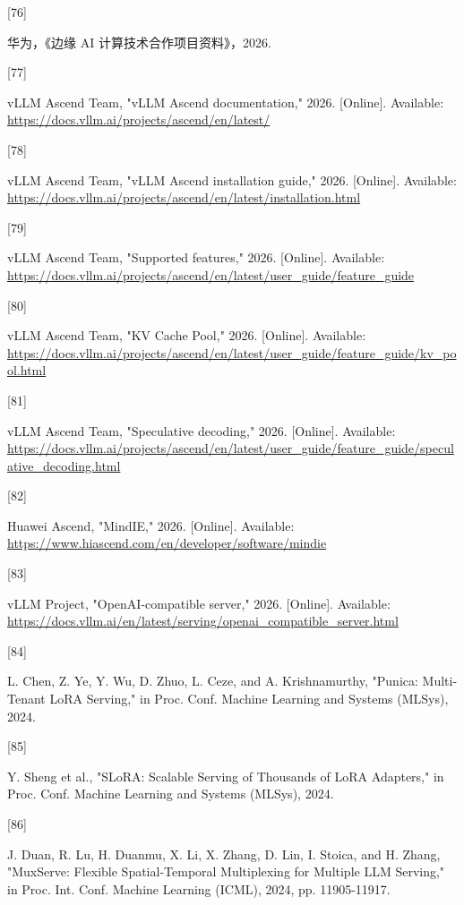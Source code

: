 \hypertarget{ref:76}{[76]} 华为，《边缘 AI 计算技术合作项目资料》，2026.

\hypertarget{ref:77}{[77]} vLLM Ascend Team, "vLLM Ascend documentation," 2026. [Online]. Available: \href{https://docs.vllm.ai/projects/ascend/en/latest/}{\url{https://docs.vllm.ai/projects/ascend/en/latest/}}

\hypertarget{ref:78}{[78]} vLLM Ascend Team, "vLLM Ascend installation guide," 2026. [Online]. Available: \href{https://docs.vllm.ai/projects/ascend/en/latest/installation.html}{\url{https://docs.vllm.ai/projects/ascend/en/latest/installation.html}}

\hypertarget{ref:79}{[79]} vLLM Ascend Team, "Supported features," 2026. [Online]. Available: \href{https://docs.vllm.ai/projects/ascend/en/latest/user_guide/feature_guide}{\url{https://docs.vllm.ai/projects/ascend/en/latest/user_guide/feature_guide}}

\hypertarget{ref:80}{[80]} vLLM Ascend Team, "KV Cache Pool," 2026. [Online]. Available: \href{https://docs.vllm.ai/projects/ascend/en/latest/user_guide/feature_guide/kv_pool.html}{\url{https://docs.vllm.ai/projects/ascend/en/latest/user_guide/feature_guide/kv_pool.html}}

\hypertarget{ref:81}{[81]} vLLM Ascend Team, "Speculative decoding," 2026. [Online]. Available: \href{https://docs.vllm.ai/projects/ascend/en/latest/user_guide/feature_guide/speculative_decoding.html}{\url{https://docs.vllm.ai/projects/ascend/en/latest/user_guide/feature_guide/speculative_decoding.html}}

\hypertarget{ref:82}{[82]} Huawei Ascend, "MindIE," 2026. [Online]. Available: \href{https://www.hiascend.com/en/developer/software/mindie}{\url{https://www.hiascend.com/en/developer/software/mindie}}

\hypertarget{ref:83}{[83]} vLLM Project, "OpenAI-compatible server," 2026. [Online]. Available: \href{https://docs.vllm.ai/en/latest/serving/openai_compatible_server.html}{\url{https://docs.vllm.ai/en/latest/serving/openai_compatible_server.html}}

\hypertarget{ref:84}{[84]} L. Chen, Z. Ye, Y. Wu, D. Zhuo, L. Ceze, and A. Krishnamurthy, "Punica: Multi-Tenant LoRA Serving," in Proc. Conf. Machine Learning and Systems (MLSys), 2024.

\hypertarget{ref:85}{[85]} Y. Sheng et al., "SLoRA: Scalable Serving of Thousands of LoRA Adapters," in Proc. Conf. Machine Learning and Systems (MLSys), 2024.

\hypertarget{ref:86}{[86]} J. Duan, R. Lu, H. Duanmu, X. Li, X. Zhang, D. Lin, I. Stoica, and H. Zhang, "MuxServe: Flexible Spatial-Temporal Multiplexing for Multiple LLM Serving," in Proc. Int. Conf. Machine Learning (ICML), 2024, pp. 11905-11917.

